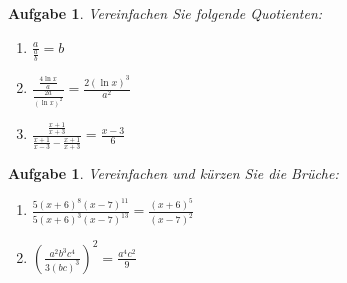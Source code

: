 \documentclass[12pt]{article}
\newtheorem{exercise}[satz]{Aufgabe}
\begin{document}
\vspace{0.2cm}

\begin{exercise}
  Vereinfachen Sie folgende Quotienten:
  \begin{multicols}{2}
    \begin{enumerate}
      \item[(a)] $\frac{a}{\frac{a}{b}} = b$
      \item[(b)] $\frac{\frac{4 \ln{x}}{a}}{\frac{2a}{(\ln{x})^2}} = \frac{2(\ln{x})^3}{a^2}$
      \item[(c)] $\frac{\frac{x+1}{x+3}}{\frac{x+1}{x-3}-\frac{x+1}{x+3}} = \frac{x-3}{6}$
    \end{enumerate}
  \end{multicols}
\end{exercise}

\vspace{0.2cm}

\begin{exercise}
  Vereinfachen und k\"urzen Sie die Br\"uche:
  \begin{enumerate}
    \item[(a)] $\frac{5(x+6)^8 (x-7)^{11}}{5(x+6)^3 (x-7)^{13}} = \frac{(x+6)^5}{(x-7)^2}$
    \item[(b)] $(\frac{a^2b^3c^4}{3(bc)^3})^2 = \frac{a^4c^2}{9}$
  \end{enumerate}
\end{exercise}
\end{document}

